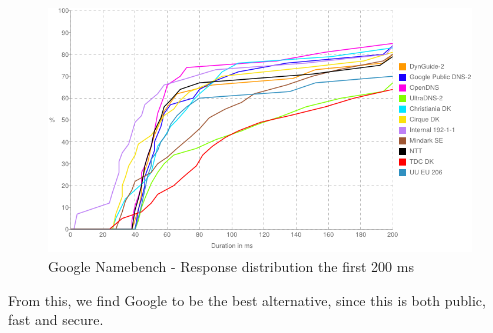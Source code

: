 \begin{figure}[ht!]
\centering
\includegraphics[width=150mm]{img/namebench_response_distro.png}
\caption{Google Namebench - Response distribution the first 200 ms}
\label{namebench_response_distro}
\end{figure}

From this, we find Google to be the best alternative, since this is both public, fast and secure.
